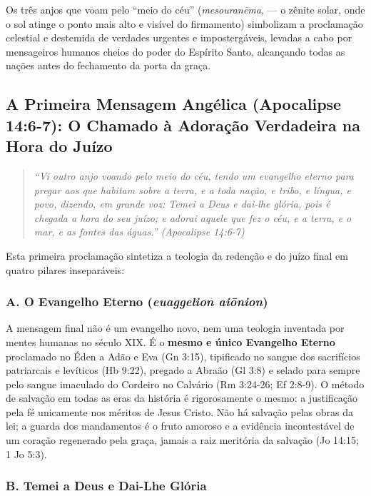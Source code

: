 \documentclass[11pt,a4paper,openany]{book}
\begin{document}
Os três anjos que voam pelo ``meio do céu'' (\textit{mesouranēma}, — o zênite solar, onde o sol atinge o ponto mais alto e visível do firmamento) simbolizam a proclamação celestial e destemida de verdades urgentes e impostergáveis, levadas a cabo por mensageiros humanos cheios do poder do Espírito Santo, alcançando todas as nações antes do fechamento da porta da graça.



\subsection{A Primeira Mensagem Angélica (Apocalipse 14:6-7): O Chamado à Adoração Verdadeira na Hora do Juízo}



\begin{quote}
\itshape \textit{``Vi outro anjo voando pelo meio do céu, tendo um evangelho eterno para pregar aos que habitam sobre a terra, e a toda nação, e tribo, e língua, e povo, dizendo, em grande voz: Temei a Deus e dai-lhe glória, pois é chegada a hora do seu juízo; e adorai aquele que fez o céu, e a terra, e o mar, e as fontes das águas.''} (Apocalipse 14:6-7)
\end{quote}


Esta primeira proclamação sintetiza a teologia da redenção e do juízo final em quatro pilares inseparáveis:


\subsubsection*{A. O Evangelho Eterno (\textit{euaggelion aiōnion})}

A mensagem final não é um evangelho novo, nem uma teologia inventada por mentes humanas no século XIX. É o \textbf{mesmo e único Evangelho Eterno} proclamado no Éden a Adão e Eva (Gn 3:15), tipificado no sangue dos sacrifícios patriarcais e levíticos (Hb 9:22), pregado a Abraão (Gl 3:8) e selado para sempre pelo sangue imaculado do Cordeiro no Calvário (Rm 3:24-26; Ef 2:8-9). O método de salvação em todas as eras da história é rigorosamente o mesmo: a justificação pela fé unicamente nos méritos de Jesus Cristo. Não há salvação pelas obras da lei; a guarda dos mandamentos é o fruto amoroso e a evidência incontestável de um coração regenerado pela graça, jamais a raiz meritória da salvação (Jo 14:15; 1 Jo 5:3).


\subsubsection*{B. Temei a Deus e Dai-Lhe Glória}
\end{document}
